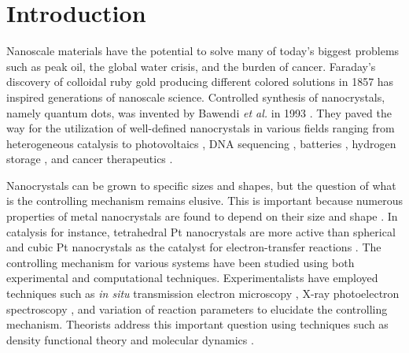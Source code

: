 
\section{Introduction}


Nanoscale materials have the potential to solve many of today's biggest problems such as peak oil, the global water crisis, and the burden of cancer.
Faraday's discovery of colloidal ruby gold producing different colored solutions in 1857 \cite{Faraday_1857,Thompson_2007} has inspired generations of nanoscale science.
Controlled synthesis of nanocrystals, namely quantum dots, was invented by Bawendi \textit{et al.} in 1993 \cite{hakimi1993quantum,Murray_2000}.
They paved the way for the utilization of well-defined nanocrystals in various fields ranging from heterogeneous catalysis \cite{astruc2008nanoparticles,Astruc_2006} to photovoltaics \cite{Atwater_2010}, DNA sequencing \cite{McNally_2010}, batteries \cite{Panniello_2014}, hydrogen storage \cite{Jena_2011,Ramos_Castillo_2015}, and cancer therapeutics \cite{Jain_2010,Kim_2010}.


Nanocrystals can be grown to specific sizes and shapes, but the question of what is the controlling mechanism remains elusive.
This is important because numerous properties of metal nanocrystals are found to depend on their size \cite{Roduner_2006} and shape \cite{Xia_2008}.
In catalysis for instance, tetrahedral Pt nanocrystals are more active than spherical and cubic Pt nanocrystals as the catalyst for electron-transfer reactions \cite{Narayanan_2005}.
The controlling mechanism for various systems have been studied using both experimental and computational techniques.
Experimentalists have employed techniques such as \textit{in situ} transmission electron microscopy \cite{Liao_2014,Woehl_2014}, X-ray photoelectron spectroscopy \cite{Gao_2004,Park_2014,Huang_1996,Kedia_2012,Bonet_2000}, and variation of reaction parameters \cite{Personick_2013,Xia_2012,Zeng_2010,Zhang_1996,Chang_2011,Zhu_2011} to elucidate the controlling mechanism.
Theorists address this important question using techniques such as density functional theory \cite{Kilin_2008,Al_Saidi_2012,Saidi_2013,Zhang_2008} and molecular dynamics \cite{Zhou_2014}.

  
  